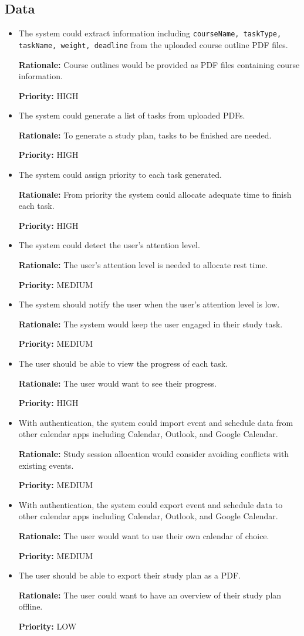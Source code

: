 \documentclass[12pt]{article}
\newcounter{reqnum} %
\newcommand{\rthereqnum}{FR\refstepcounter{reqnum}\thereqnum:}
\begin{document}
\subsection{Data}
\begin{itemize}[leftmargin=16.5mm,labelsep=4mm,label=\rthereqnum]
\item
The system could extract information including \texttt{courseName, taskType, taskName, weight, deadline} from the uploaded course outline PDF files.

\textbf{Rationale:} Course outlines would be provided as PDF files containing course information.

\textbf{Priority:} HIGH
\item
The system could generate a list of tasks from uploaded PDFs.

\textbf{Rationale:} To generate a study plan, tasks to be finished are needed.

\textbf{Priority:} HIGH
\item[\rthereqnum \label{R_prioritize_task}]
The system could assign priority to each task generated.

\textbf{Rationale:} From priority the system could allocate adequate time to finish each task.

\textbf{Priority:} HIGH
\item
The system could detect the user's attention level.

\textbf{Rationale:} The user's attention level is needed to allocate rest time.

\textbf{Priority:} MEDIUM
\item
The system should notify the user when the user's attention level is low.

\textbf{Rationale:} The system would keep the user engaged in their study task.

\textbf{Priority:} MEDIUM
\item[\rthereqnum \label{R_check_task_progress}]
The user should be able to view the progress of each task.

\textbf{Rationale:} The user would want to see their progress.

\textbf{Priority:} HIGH
\item
With authentication, the system could import event and schedule data from other calendar apps including Calendar, Outlook, and Google Calendar.

\textbf{Rationale:} Study session allocation would consider avoiding conflicts with existing events.

\textbf{Priority:} MEDIUM
\item
With authentication, the system could export event and schedule data to other calendar apps including Calendar, Outlook, and Google Calendar.

\textbf{Rationale:} The user would want to use their own calendar of choice.

\textbf{Priority:} MEDIUM
\item
The user should be able to export their study plan as a PDF.

\textbf{Rationale:} The user could want to have an overview of their study plan offline.

\textbf{Priority:} LOW
\end{itemize}
\end{document}
